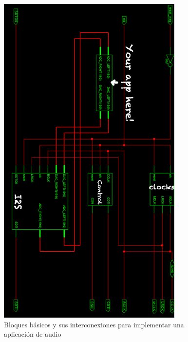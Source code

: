 \begin{figure}[H]
\begin{center}
	\includegraphics[scale=0.85]{./fig}
\caption{Bloques básicos y sus interconexiones para implementar una aplicación de audio}
\end{center}
\end{figure}
